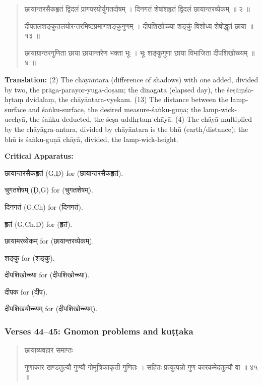 \documentclass[11pt,a4paper]{article}
\newcommand{\dev}[1]{{\devanagarifont #1}}
\newenvironment{sanskritverse}{%
  \begin{quote}%
  \devanagarifont%
  \setlength{\leftmargin}{2em}%
}{\end{quote}}
\newenvironment{variants}{%
  \small%
  \color{varecolor}%
  \list{}{\leftmargin=2em\itemindent=-1em}%
}{\endlist}
\begin{document}
\begin{sanskritverse}
\dev{छायान्तरसैकहृतं द्विदलं प्रागपरयोर्युगतदोषम्} ।
\dev{दिनगतं शेषांशहृतं द्विदलं छायान्तरव्येकम् ॥ २ ॥}

\dev{दीपतलशङ्कुतलयोरन्तरमिष्टप्रमाणशङ्कुगुणम्} ।
\dev{दीपशिखोच्च्या शङ्कुं विशोध्य शेषोद्धृतं छाया ॥ १३ ॥}

\dev{छायाग्रान्तरगुणिता छाया छायान्तरेण भक्ता भूः} ।
\dev{भूः शङ्कुगुणा छाया विभाजिता दीपशिखोच्च्यम् ॥ ४ ॥}
\end{sanskritverse}

\textbf{Translation:} (2) The chāyāntara (difference of shadows) with one added, 
divided by two, the prāga-parayor-yuga-doṣam; the dinagata (elapsed day), the 
śeṣāṃśa-hṛtaṃ dvidalaṃ, the chāyāntara-vyekam. (13) The distance between the lamp-surface 
and śaṅku-surface, the desired measure-śaṅku-guṇa; the lamp-wick-ucchyā, the śaṅku 
deducted, the śeṣa-uddhṛtaṃ chāyā. (4) The chāyā multiplied by the chāyāgra-antara, 
divided by chāyāntara is the bhū (earth/distance); the bhū is śaṅku-guṇā chāyā, 
divided, the lamp-wick-height.

\textcolor{varecolor}{\textbf{Critical Apparatus:}}
\begin{variants}
\item[2.1] \dev{छायान्तरसैकहृतं} (G,Ḍ) \dev{for} (\dev{छायान्तरसैकहृतं}).
\item[2.2] \dev{चुगतशेषम्} (Ḍ,G) \dev{for} (\dev{चुगतशेषम्}).
\item[2.3] \dev{दिनगतं} (G,Ch) \dev{for} (\dev{दिनगतं}).
\item[2.4] \dev{हृतं} (G,Ch,Ḍ) \dev{for} (\dev{हृतं}).
\item[2.5] \dev{छायामरव्येकम्} \dev{for} (\dev{छायान्तरव्येकम्}).
\item[13.1] \dev{शङ्कु} \dev{for} (\dev{शङ्कु}).
\item[13.2] \dev{दीपशिखोच्च्या} \dev{for} (\dev{दीपशिखोच्च्या}).
\item[4.1] \dev{दीपक} \dev{for} (\dev{दीप}).
\item[4.2] \dev{दीपशिखयौच्च्यम्} \dev{for} (\dev{दीपशिखोच्च्यम्}).
\end{variants}

\subsubsection*{Verses 44--45: Gnomon problems and kuṭṭaka}

\begin{sanskritverse}
\dev{छायाव्यवहार समाप्तः}

\dev{गुणाकार खण्डतुल्यौ गुण्यौ गोमूत्रिकाकृती गुणितः} ।
\dev{सहितः प्रत्युत्पन्नो गुण कारकमेदतुल्यौ वा ॥ ४५ ॥}
\end{sanskritverse}
\end{document}
